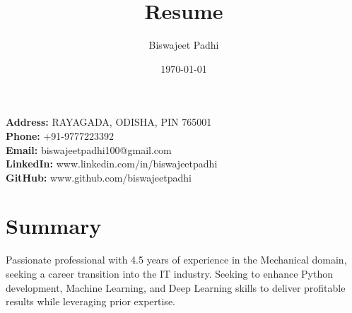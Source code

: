 \documentclass[a4paper,11pt]{article}
\begin{document}
\title{Resume}
\author{Biswajeet Padhi}
\date{\today}
\maketitle

\noindent
\textbf{Address:} RAYAGADA, ODISHA, PIN 765001 \\
\textbf{Phone:} +91-9777223392 \\
\textbf{Email:} biswajeetpadhi100@gmail.com \\
\textbf{LinkedIn:} www.linkedin.com/in/biswajeetpadhi \\
\textbf{GitHub:} www.github.com/biswajeetpadhi

\section*{Summary}
Passionate professional with 4.5 years of experience in the Mechanical domain, seeking a career transition into the IT industry. Seeking to enhance Python development, Machine Learning, and Deep Learning skills to deliver profitable results while leveraging prior expertise.
\end{document}
